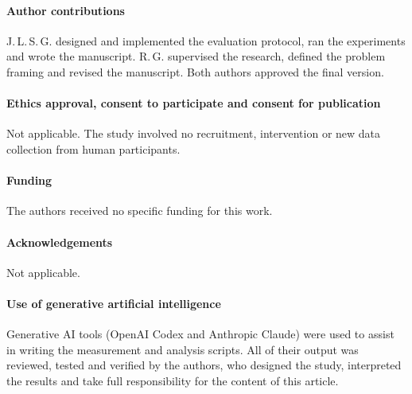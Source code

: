 \documentclass[sn-basic,Numbered]{sn-jnl}
\begin{document}
\paragraph{Author contributions}
J.\,L.\,S.\,G. designed and implemented the evaluation protocol, ran the experiments and
wrote the manuscript. R.\,G. supervised the research, defined the problem framing and
revised the manuscript. Both authors approved the final version.

\paragraph{Ethics approval, consent to participate and consent for publication}
Not applicable. The study involved no recruitment, intervention or new data collection
from human participants.

\paragraph{Funding}
The authors received no specific funding for this work.

\paragraph{Acknowledgements}
Not applicable.

\paragraph{Use of generative artificial intelligence}
Generative AI tools (OpenAI Codex and Anthropic Claude) were used to assist in writing the
measurement and analysis scripts. All of their output was reviewed, tested and verified by
the authors, who designed the study, interpreted the results and take full responsibility
for the content of this article.


\end{document}

